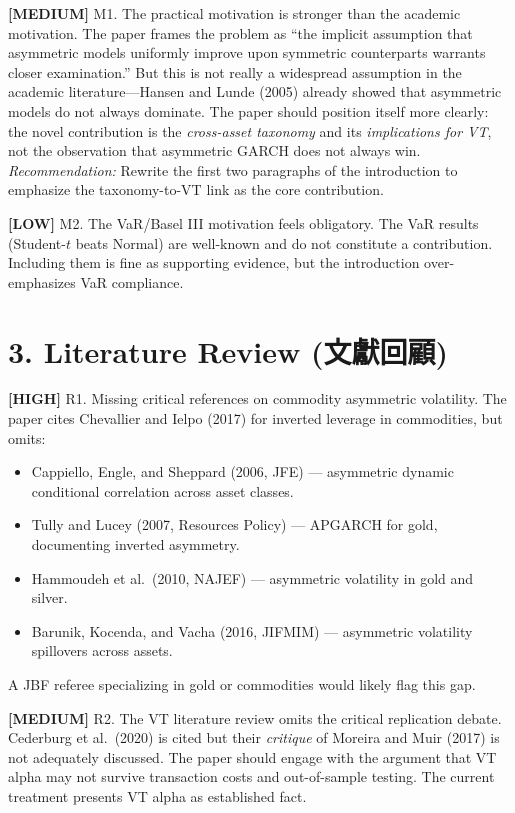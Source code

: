 \documentclass[12pt,a4paper]{article}
\newcommand{\high}[1]{\textcolor{errorred}{\textbf{[HIGH]} #1}}
\newcommand{\med}[1]{\textcolor{warncolor}{\textbf{[MEDIUM]} #1}}
\newcommand{\low}[1]{\textcolor{okgreen}{\textbf{[LOW]} #1}}
\begin{document}
\med{M1. The practical motivation is stronger than the academic motivation.} The paper frames the problem as ``the implicit assumption that asymmetric models uniformly improve upon symmetric counterparts warrants closer examination.'' But this is not really a widespread assumption in the academic literature---Hansen and Lunde (2005) already showed that asymmetric models do not always dominate. The paper should position itself more clearly: the novel contribution is the \emph{cross-asset taxonomy} and its \emph{implications for VT}, not the observation that asymmetric GARCH does not always win. \emph{Recommendation:} Rewrite the first two paragraphs of the introduction to emphasize the taxonomy-to-VT link as the core contribution.

\low{M2. The VaR/Basel III motivation feels obligatory.} The VaR results (Student-$t$ beats Normal) are well-known and do not constitute a contribution. Including them is fine as supporting evidence, but the introduction over-emphasizes VaR compliance.


\section*{3. Literature Review (文獻回顧)}

\high{R1. Missing critical references on commodity asymmetric volatility.} The paper cites Chevallier and Ielpo (2017) for inverted leverage in commodities, but omits:
\begin{itemize}[nosep]
\item Cappiello, Engle, and Sheppard (2006, JFE) --- asymmetric dynamic conditional correlation across asset classes.
\item Tully and Lucey (2007, Resources Policy) --- APGARCH for gold, documenting inverted asymmetry.
\item Hammoudeh et al.\ (2010, NAJEF) --- asymmetric volatility in gold and silver.
\item Barunik, Kocenda, and Vacha (2016, JIFMIM) --- asymmetric volatility spillovers across assets.
\end{itemize}
A JBF referee specializing in gold or commodities would likely flag this gap.

\med{R2. The VT literature review omits the critical replication debate.} Cederburg et al.\ (2020) is cited but their \emph{critique} of Moreira and Muir (2017) is not adequately discussed. The paper should engage with the argument that VT alpha may not survive transaction costs and out-of-sample testing. The current treatment presents VT alpha as established fact.
\end{document}
